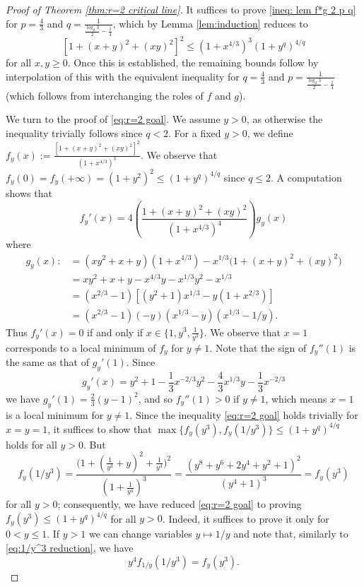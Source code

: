 \documentclass[reqno, 10pt]{amsart}
\theoremstyle{plain}
\numberwithin{equation}{section}
\theoremstyle{definition}
\newtheorem*{induction hypothesis}{Induction hypothesis}
\theoremstyle{remark}
\begin{document}
\begin{proof}[Proof of Theorem \ref{thm:r=2 critical line}]
It suffices to prove \eqref{ineq: lem f*g 2 p q} for $p=\frac{4}{3}$ and $q=\frac{1}{\frac{\log_2 3}{2}-\frac{1}{4}}$, which by Lemma \ref{lem:induction} reduces to
\begin{equation}\label{eq:r=2 goal}
[1+(x+y)^2+(xy)^2]^{2}\leq (1+x^{4/3})^{3}(1+y^q)^{4/q}    
\end{equation}
for all $x,y\geq 0$. Once this is established, the remaining bounds follow by interpolation of this with the equivalent inequality for $q=\frac{4}{3}$ and $p=\frac{1}{\frac{\log_2 3}{2}-\frac{1}{4}}$ (which follows from interchanging the roles of $f$ and $g$). 

We turn to the proof of \eqref{eq:r=2 goal}. We assume $y>0$, as otherwise the inequality trivially follows since $q < 2$. For a fixed $y>0$, we define $f_{y}(x):=\frac{[1+(x+y)^2+(xy)^2]^{2}}{(1+x^{4/3})^{3}}$. We observe that $f_y(0)=f_y(+\infty)=(1+y^2)^2\leq (1+y^{q})^{4/q}$ since $q \leq 2$. 
A computation shows that
\begin{equation*}
    f_y'(x)=4 \left(\frac{1+(x+y)^2+(xy)^2}{(1+x^{4/3})^4}\right)g_y(x)    
\end{equation*}
where
\begin{align*}
    g_y(x):&=(xy^2+x+y)(1+x^{4/3})-x^{1/3}\big(1+(x+y)^2+(xy)^2\big) \\
    & = xy^2+x+y-x^{4/3}y-x^{1/3}y^2-x^{1/3} \\
    & = (x^{2/3}-1)[(y^2+1)x^{1/3}-y(1+x^{2/3})] \\
    & = (x^{2/3}-1)(-y)(x^{1/3}-y)(x^{1/3}-1/y).
\end{align*}
Thus $f_y'(x)=0$ if and only if $x\in\{1,y^3,\frac{1}{y^3}\}$. We observe that $x=1$ corresponds to a local minimum of $f_y$ for $y \neq 1$. Note that the sign of $f_y''(1)$ is the same as that of $g_y'(1)$. Since
\begin{equation*}
    g_y'(x)=y^2+1-\frac{1}{3}x^{-2/3}y^2 - \frac{4}{3}x^{1/3}y - \frac{1}{3}x^{-2/3}
\end{equation*}
we have $g_y'(1)=\frac{2}{3}(y-1)^2$, and so $f_y''(1)>0$ if $y \neq 1$, which means $x=1$ is a local minimum for $y \neq 1$. Since the inequality \eqref{eq:r=2 goal} holds trivially for $x=y=1$, it suffices to show that $\max \{f_y(y^3), f_y(1/y^3)\} \leq (1+y^q)^{4/q}$ holds for all $y > 0$. But
\begin{equation}\label{eq:1/y^3 reduction}
f_y(1/y^3)=\frac{\big(1+(\frac{1}{y^3}+y)^2+\frac{1}{y^4}\big)^{2}}{(1+\frac{1}{y^4})^{3}}=\frac{(y^8+y^6+2y^4+y^2+1)^{2}}{(y^{4}+1)^{3}}=f_y(y^3) 
\end{equation}
for all $y>0$; consequently, we have reduced \eqref{eq:r=2 goal} to proving $f_y(y^3) \leq (1+y^q)^{4/q}$ for all $y>0$. Indeed, it suffices to prove it only for $0 < y \leq 1$. If $y>1$ we can change variables $y \mapsto 1/y$ and note that, similarly to \eqref{eq:1/y^3 reduction}, we have
\begin{equation*}
    y^4 f_{1/y}(1/y^3)=f_y(y^3).
\end{equation*}



\end{proof}
\end{document}
